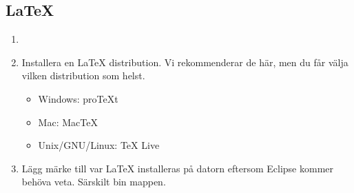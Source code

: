 \documentclass[11pt]{amsart}
\begin{document}
\subsection{LaTeX}
\begin{enumerate}
\item[] {}
\item Installera en LaTeX distribution. Vi rekommenderar de h\"{a}r, men du f\r{a}r v\"{a}lja vilken distribution som helst.
	\begin{itemize}
	\item Windows: proTeXt {}
	\item Mac: MacTeX {}
	\item Unix/GNU/Linux: TeX Live {} \\
	\end{itemize}
\item L\"{a}gg m\"{a}rke till var LaTeX installeras p\r{a} datorn eftersom Eclipse kommer beh\"{o}va veta. S\"{a}rskilt bin mappen.
\end{enumerate}
\end{document}
